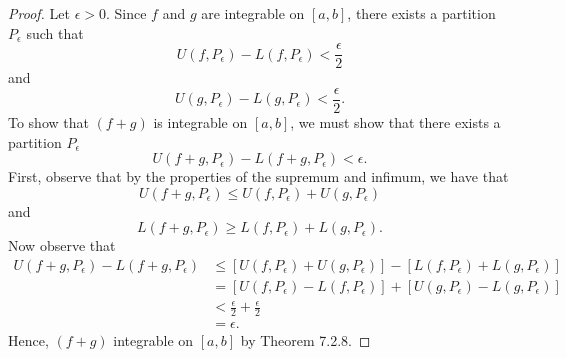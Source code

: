 \begin{proof}\label{proof:theproof}
	Let \( \epsilon > 0 \). Since \( f \) and \( g  \) are integrable on \( [a,b]  \), there exists a partition \( P_{\epsilon } \) such that 
	\[  U(f, P_{\epsilon }) - L(f, P_{\epsilon }) < \frac{ \epsilon  }{ 2 }   \]
	and 
	\[  U(g, P_{\epsilon }) - L(g, P_{\epsilon }) < \frac{ \epsilon  }{ 2 } . \]
	To show that \( (f+g)  \) is integrable on \( [a,b] \), we must show that there exists a partition \( P_{\epsilon } \)
	\[  U(f+g, P_{\epsilon }) - L(f +g, P_{\epsilon }) < \epsilon. \]
	First, observe that by the properties of the supremum and infimum, we have 
	that 
	\[  U(f+g, P_{\epsilon }) \leq U(f, P_{\epsilon }) + U(g, P_{\epsilon }) \]
	and 
	\[  L(f+g, P_{\epsilon }) \geq L(f, P_{\epsilon }) + L(g, P_{\epsilon }). \]
	Now observe that
	\begin{align*}
		U(f+g, P_{\epsilon }) - L(f+g, P_{\epsilon }) &\leq [U(f,P_{\epsilon }) + U(g, P_{\epsilon })] - [L(f,P_{\epsilon }) + L(g, P_{\epsilon })] \\
													  &= [U(f,P_{\epsilon }) - L(f,P_{\epsilon })] + [U(g, P_{\epsilon }) - L(g, P_{\epsilon })] \\
													  &< \frac{ \epsilon  }{ 2 }  + \frac{ \epsilon  }{ 2 } \\
													  &= \epsilon.
	\end{align*}
	Hence, \( (f+g)  \) integrable on \( [a,b]  \) by Theorem 7.2.8.  


\end{proof}
